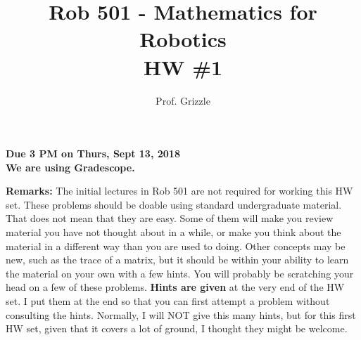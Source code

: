\documentclass[letterpaper]{article}
\author{Prof. Grizzle}
\title{Rob 501 - Mathematics for Robotics\\
HW \#1}
\begin{document}
\date{}
\maketitle


 \newcommand{\trace}{\mathrm{trace}}
\newcommand{\real}{\mathbb R}  %
\newcommand{\nat}{\mathbb R}   %
\newcommand{\cp}{\mathbb C}    %
\newcommand{\ds}{\displaystyle}
\newcommand{\mf}[2]{\frac{\ds #1}{\ds #2}}
\newcommand{\book}[2]{{Luenberger, Page~#1, }{Prob.~#2}}
\newcommand{\spanof}[1]{\textrm{span} \{ #1 \}}
\parindent 0pt


\begin{flushright}
\textbf{Due 3 PM on Thurs, Sept 13, 2018}\\
\textbf{We are using Gradescope.}\\[3mm]
\end{flushright}

\noindent \textbf{Remarks:}  The initial lectures in Rob 501 are not required for working this HW set. These problems should be doable using standard undergraduate material. That does not mean that they are easy. Some of them will make you review material you have not thought about in a while, or make you think about the material in a different way than you are used to doing. Other concepts may be new, such as the trace of a matrix, but it should be within your ability to learn the material on your own with a few hints.  You will probably be scratching your head on a few of these problems. \textbf{Hints are given} at the very end of the HW set. I put them at the end so that you can first attempt a problem without consulting the hints. Normally, I will NOT give this many hints, but for this first HW set, given that it covers a lot of ground, I thought they might be welcome.
\end{document}
